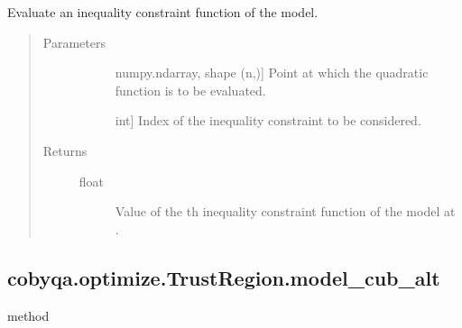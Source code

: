 \documentclass[letterpaper,10pt,english]{sphinxmanual}
\begin{document}
\begin{fulllineitems}
\begin{fulllineitems}
\label{\detokenize{refs/generated/cobyqa.optimize.TrustRegion.model_cub:cobyqa.optimize.TrustRegion.model_cub}}
\sphinxAtStartPar
Evaluate an inequality constraint function of the model.
\begin{quote}\begin{description}
\item[{Parameters}] \leavevmode\begin{description}
\item[{}] \leavevmode{[}numpy.ndarray, shape (n,){]}
\sphinxAtStartPar
Point at which the quadratic function is to be evaluated.

\item[{}] \leavevmode{[}int{]}
\sphinxAtStartPar
Index of the inequality constraint to be considered.

\end{description}

\item[{Returns}] \leavevmode\begin{description}
\item[{float}] \leavevmode
\sphinxAtStartPar
Value of the \sphinxhyphen{}th inequality constraint function of the model at
.

\end{description}

\end{description}\end{quote}

\end{fulllineitems}



\subsection{cobyqa.optimize.TrustRegion.model\_cub\_alt}
\label{\detokenize{refs/generated/cobyqa.optimize.TrustRegion.model_cub_alt:cobyqa-optimize-trustregion-model-cub-alt}}\label{\detokenize{refs/generated/cobyqa.optimize.TrustRegion.model_cub_alt::doc}}
\sphinxAtStartPar
method


\end{fulllineitems}
\end{document}
